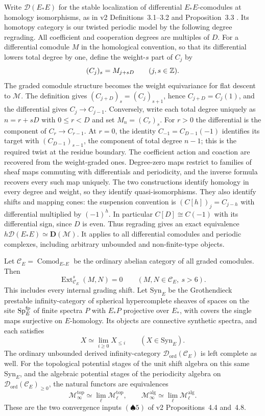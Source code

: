 Write $\mathcal D(E_*E)$ for the stable localization of differential
$E_*E$-comodules at homology isomorphisms, as in v2
Definitions~3.1--3.2 and Proposition~3.3
\cite{Pstragowski2021}. Its homotopy category is our twisted periodic
model by the following degree regrading. All coefficient and
cooperation degrees are multiples of $D$. For a differential comodule
$M$ in the homological convention, so that its differential lowers
total degree by one, define the weight-$s$ part of $C_j$ by
\[
 (C_j)_s=M_{j+sD}\qquad(j,s\in\mathbb Z).
\]
The graded comodule structure becomes the weight equivariance for flat
descent to $\mathcal M$. The definition gives
$(C_{j+D})_s=(C_j)_{s+1}$, hence $C_{j+D}=C_j(1)$, and the differential
gives $C_j\to C_{j-1}$. Conversely, write each total degree uniquely as
$n=r+sD$ with $0\leq r<D$ and set $M_n=(C_r)_s$. For $r>0$ the
differential is the component of $C_r\to C_{r-1}$. At $r=0$, the
identity $C_{-1}=C_{D-1}(-1)$ identifies its target with
$(C_{D-1})_{s-1}$, the component of total degree $n-1$; this is the
required twist at the residue boundary. The coefficient action and
coaction are recovered from the weight-graded ones. Degree-zero maps
restrict to families of sheaf maps commuting with differentials and
periodicity, and the inverse formula recovers every such map uniquely.
The two constructions identify homology in every degree and weight,
so they identify quasi-isomorphisms. They also identify shifts and
mapping cones: the suspension convention is
$(C[h])_j=C_{j-h}$ with differential multiplied by $(-1)^h$.
In particular $C[D]\cong C(-1)$ with its differential sign, since
$D$ is even. Thus regrading gives an exact equivalence
$h\mathcal D(E_*E)\simeq\mathbf D(\mathcal M)$. It applies to all
differential comodules and periodic complexes, including arbitrary
unbounded and non-finite-type objects.

\begin{lemma}
\label{rew:comp:height-two-inputs}
Let $\mathscr C_E=\operatorname{Comod}_{E_*E}$ be the ordinary abelian
category of all graded comodules. Then
\[
 \operatorname{Ext}_{\mathscr C_E}^{s}(M,N)=0
 \qquad(M,N\in\mathscr C_E,\ s>6).
\]
This includes every internal grading shift. Let $\mathrm{Syn}_E$ be
the Grothendieck prestable infinity-category of spherical hypercomplete
sheaves of spaces on the site $\mathrm{Sp}_E^{\mathrm{fp}}$ of finite spectra
$P$ with $E_*P$ projective over $E_*$, with covers the single maps
surjective on $E$-homology. Its objects are connective synthetic
spectra, and each satisfies
\[
 X\simeq\lim_{i\geq0}X_{\leq i}\qquad(X\in\mathrm{Syn}_E).
\]
The ordinary unbounded derived infinity-category
$\mathcal D_{\mathrm{ord}}(\mathscr C_E)$ is left complete as well.
For the topological potential stages of the unit shift algebra on this
same $\mathrm{Syn}_E$, and the algebraic potential stages of the
periodicity algebra on $\mathcal D_{\mathrm{ord}}(\mathscr C_E)_{\geq0}$,
the natural functors are equivalences
\[
 \mathcal M_\infty^{\mathrm{top}}\simeq
       \lim_\ell\mathcal M_\ell^{\mathrm{top}},\qquad
 \mathcal M_\infty^{\mathrm{alg}}\simeq
       \lim_\ell\mathcal M_\ell^{\mathrm{alg}}.
\]
These are the two convergence inputs $(\spadesuit5)$ of v2
Propositions~4.4 and~4.8.
\end{lemma}

